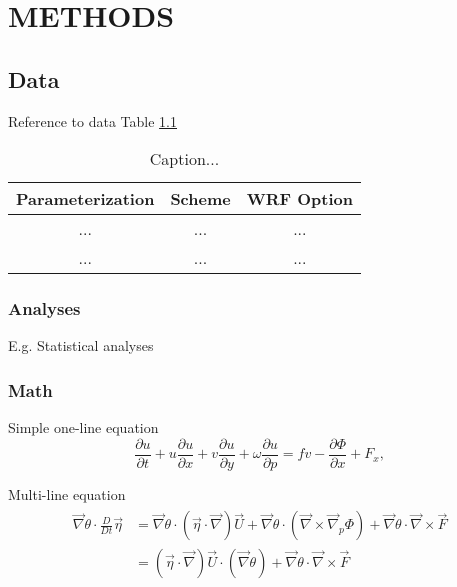 \chapter{METHODS}
\label{chap:meth}

\section{Data}
\label{sec:dat}

Reference to data Table \ref{tab:data}

\begin{table}[htp]
\caption{Caption...}\label{tab:data}
\begin{center}
\begin{tabular}{| c | c c |}
\hline
Parameterization & Scheme & WRF Option \\
\hline
 ... & ... & ... \\
 ... & ... & ... \\

 \hline
\end{tabular}
\end{center}
\end{table}

\subsection{Analyses}

E.g. Statistical analyses

\subsection{Math}

Simple one-line equation
\begin{equation}
\frac{\partial u}{\partial t} +u\frac{\partial u}{\partial x} +v\frac{\partial u}{\partial y} +\omega\frac{\partial u}{\partial p} = fv -\frac{\partial \Phi}{\partial x} + F_x,
\label{eqn:momu}
\end{equation}

Multi-line equation
\begin{align}
\begin{split}
\vec{\nabla}\theta \cdot \frac{D}{Dt}\vec{\eta} &= \vec{\nabla}\theta \cdot (\vec{\eta}\cdot\vec{\nabla})\vec{U} + \vec{\nabla}\theta \cdot (\vec{\nabla}\times\vec{\nabla}_p\Phi) +  \vec{\nabla}\theta \cdot \vec{\nabla}\times\vec{F}  \\
&=  (\vec{\eta}\cdot\vec{\nabla})\vec{U} \cdot (\vec{\nabla}\theta) + \vec{\nabla}\theta \cdot \vec{\nabla}\times\vec{F}
\label{eqn:vort4}
\end{split}
\end{align}
